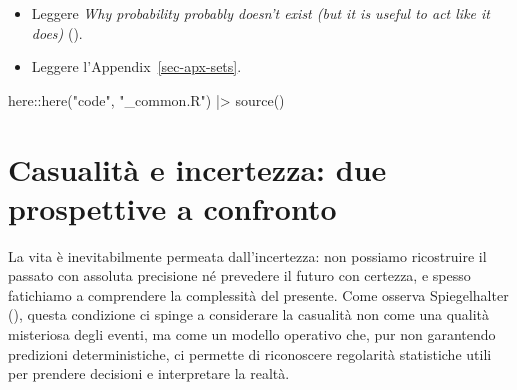 \documentclass[
  letterpaper,
  DIV=11,
  numbers=noendperiod,
  oneside]{scrreprt}
\newenvironment{Shaded}{\begin{snugshade}}{\end{snugshade}}
\newcommand{\FunctionTok}[1]{\textcolor[rgb]{0.28,0.35,0.67}{#1}}
\newcommand{\NormalTok}[1]{\textcolor[rgb]{0.00,0.23,0.31}{#1}}
\newcommand{\SpecialCharTok}[1]{\textcolor[rgb]{0.37,0.37,0.37}{#1}}
\newcommand{\StringTok}[1]{\textcolor[rgb]{0.13,0.47,0.30}{#1}}
\providecommand{\tightlist}{%
  \setlength{\itemsep}{0pt}\setlength{\parskip}{0pt}}
\theoremstyle{definition}
\theoremstyle{plain}
\theoremstyle{definition}
\theoremstyle{remark}
\begin{document}
\begin{tcolorbox}[enhanced jigsaw, arc=.35mm, breakable, colbacktitle=quarto-callout-tip-color!10!white, opacityback=0, toprule=.15mm, rightrule=.15mm, colback=white, opacitybacktitle=0.6, leftrule=.75mm, coltitle=black, bottomtitle=1mm, left=2mm, toptitle=1mm, title=\textcolor{quarto-callout-tip-color}{\faLightbulb}\hspace{0.5em}{Prerequisiti}, titlerule=0mm, bottomrule=.15mm, colframe=quarto-callout-tip-color-frame]

\begin{itemize}
\tightlist
\item
  Leggere \emph{Why probability probably doesn't exist (but it is useful
  to act like it does)}
  ().
\item
  Leggere l'Appendix~\ref{sec-apx-sets}.
\end{itemize}

\end{tcolorbox}

\begin{tcolorbox}[enhanced jigsaw, arc=.35mm, breakable, colbacktitle=quarto-callout-caution-color!10!white, opacityback=0, toprule=.15mm, rightrule=.15mm, colback=white, opacitybacktitle=0.6, leftrule=.75mm, coltitle=black, bottomtitle=1mm, left=2mm, toptitle=1mm, title=\textcolor{quarto-callout-caution-color}{\faFire}\hspace{0.5em}{Preparazione del Notebook}, titlerule=0mm, bottomrule=.15mm, colframe=quarto-callout-caution-color-frame]

\begin{Shaded}
\begin{Highlighting}[]
\NormalTok{here}\SpecialCharTok{::}\FunctionTok{here}\NormalTok{(}\StringTok{"code"}\NormalTok{, }\StringTok{"\_common.R"}\NormalTok{) }\SpecialCharTok{|\textgreater{}} 
  \FunctionTok{source}\NormalTok{()}
\end{Highlighting}
\end{Shaded}

\end{tcolorbox}

\section{Casualità e incertezza: due prospettive a
confronto}\label{casualituxe0-e-incertezza-due-prospettive-a-confronto}

La vita è inevitabilmente permeata dall'incertezza: non possiamo
ricostruire il passato con assoluta precisione né prevedere il futuro
con certezza, e spesso fatichiamo a comprendere la complessità del
presente. Come osserva Spiegelhalter
(), questa condizione
ci spinge a considerare la casualità non come una qualità misteriosa
degli eventi, ma come un modello operativo che, pur non garantendo
predizioni deterministiche, ci permette di riconoscere regolarità
statistiche utili per prendere decisioni e interpretare la realtà.
\end{document}
